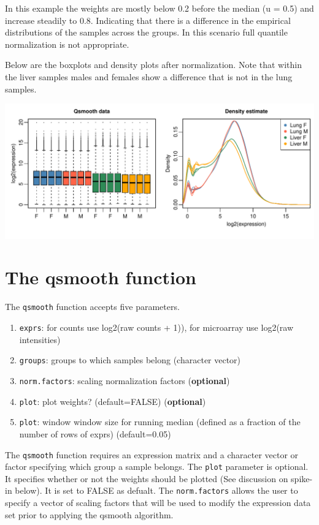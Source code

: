 \documentclass{article}\usepackage[]{graphicx}\usepackage[usenames,dvipsnames]{color}
\makeatletter
\def\maxwidth{ %
  \ifdim\Gin@nat@width>\linewidth
    \linewidth
  \else
    \Gin@nat@width
  \fi
}
\newenvironment{knitrout}{}{} %
\makeatother
\begin{document}
In this example the weights are mostly below 0.2 before the median 
(u = 0.5) and increase steadily to 0.8.
Indicating that there is a difference in the empirical distributions
of the samples across the groups. In this scenario full quantile
normalization is not appropriate.

Below are the boxplots and density plots after normalization.
Note that within the liver samples males and females show a difference
that is not in the lung samples.

\begin{knitrout}
\color{fgcolor}

{\centering \includegraphics[width=\maxwidth]{figure/norm_data12-1} 

}



\end{knitrout}

\section{The qsmooth function}
The \texttt{qsmooth} function accepts five parameters.
\begin{enumerate}
\item \texttt{exprs}: for counts use log2(raw counts + 1)), for microarray use log2(raw intensities)
\item \texttt{groups}: groups to which samples belong (character vector)
\item \texttt{norm.factors}: scaling normalization factors ({\bf optional})
\item \texttt{plot}: plot weights? (default=FALSE) ({\bf optional})
\item \texttt{plot}: window window size for running median (defined as a fraction of the number of rows of exprs) (default=0.05)
\end{enumerate}
The \texttt{qsmooth} function requires an expression matrix and a 
character vector or factor specifying which group a sample belongs.
The \texttt{plot} parameter is optional. It specifies whether or
not the weights should be plotted (See discussion on spike-in below). 
It is set to FALSE as defualt. 
The \texttt{norm.factors} allows the user to specify a 
vector of scaling factors that will be used to modify the 
expression data set prior to applying the qsmooth algorithm.
\end{document}
